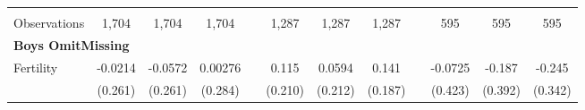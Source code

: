 \begin{landscape}
\begin{table}[htpb!]
\begin{center}
\begin{tabular}{lcccp{2mm}cccp{2mm}ccc}
\begin{footnotesize}\end{footnotesize}&\begin{footnotesize}\end{footnotesize}&\begin{footnotesize}\end{footnotesize}&\begin{footnotesize}\end{footnotesize}&\begin{footnotesize}\end{footnotesize}&\begin{footnotesize}\end{footnotesize}&\begin{footnotesize}\end{footnotesize}&\begin{footnotesize}\end{footnotesize}&\begin{footnotesize}\end{footnotesize}&\begin{footnotesize}\end{footnotesize}&\begin{footnotesize}\end{footnotesize}&\begin{footnotesize}\end{footnotesize}\\Observations&1,704&1,704&1,704&&1,287&1,287&1,287&&595&595&595\\
\multicolumn{12}{l}{\textbf{Boys OmitMissing}}\\ 
Fertility&-0.0214&-0.0572&0.00276&&0.115&0.0594&0.141&&-0.0725&-0.187&-0.245\\
&(0.261)&(0.261)&(0.284)&&(0.210)&(0.212)&(0.187)&&(0.423)&(0.392)&(0.342)\\

\end{tabular}
\end{center}
\end{table}
\end{landscape}

